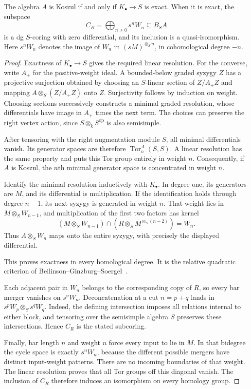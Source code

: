 \begin{theorem}\label{cbc:quiver:koszul}
The algebra $A$ is Koszul if and only if $K_\bullet\to S$ is exact.
When it is exact, the subspace
\[
 C_R=\bigoplus_{n\ge0}s^nW_n\subseteq B_SA
\]
is a dg $S$-coring with zero differential, and its inclusion is a quasi-isomorphism.
Here $s^nW_n$ denotes the image of $W_n$ in $(sM)^{\otimes_S n}$, in cohomological degree $-n$.
\end{theorem}
\begin{proof}
Exactness of $K_\bullet\to S$ gives the required linear resolution.
For the converse, write $A_+$ for the positive-weight ideal.
A bounded-below graded syzygy $Z$ has a projective surjection obtained by choosing an $S$-linear section of $Z/A_+Z$ and mapping
$A\otimes_S(Z/A_+Z)$ onto $Z$.
Surjectivity follows by induction on weight.
Choosing sections successively constructs a minimal graded resolution, whose differentials have image in $A_+$ times the next term.
The choices can preserve the right vertex action, since $S\otimes_k S^{\mathrm{op}}$ is also semisimple.

After tensoring with the right augmentation module $S$, all minimal differentials vanish.
Its generator spaces are therefore $\operatorname{Tor}^A_n(S,S)$.
A linear resolution has the same property and puts this Tor group entirely in weight $n$.
Consequently, if $A$ is Koszul, the $n$th minimal generator space is concentrated in weight $n$.

Identify the minimal resolution inductively with $K_\bullet$.
In degree one, its generators are $M$, and its differential is multiplication.
If the identification holds through degree $n-1$, its next syzygy is generated in weight $n$.
That weight lies in $M\otimes_S W_{n-1}$, and multiplication of the first two factors has kernel
\[
 (M\otimes_S W_{n-1})\cap
 (R\otimes_S M^{\otimes_S(n-2)})=W_n.
\]
Thus $A\otimes_S W_n$ maps onto the entire syzygy, with precisely the displayed differential.

This proves exactness in every homological degree.
It is the relative quadratic criterion of Beilinson--Ginzburg--Soergel~\cite[Theorem~2.6.1]{BGS1996}.

Each adjacent pair in $W_n$ belongs to the corresponding copy of $R$, so every bar merger vanishes on $s^nW_n$.
Deconcatenation at a cut $n=p+q$ lands in $s^pW_p\otimes_S s^qW_q$.
Indeed, the defining intersection imposes all relations internal to either block, and tensoring over the semisimple algebra $S$ preserves these intersections.
Hence $C_R$ is the stated subcoring.

Finally, bar length $n$ and weight $n$ force every input to lie in $M$.
In that bidegree the cycle space is exactly $s^nW_n$, because the different possible mergers have distinct input-weight patterns.
There are no incoming boundaries of that weight.
The linear resolution proves that all Tor groups off this diagonal vanish.
The inclusion of $C_R$ therefore induces an isomorphism on every homology group.
\end{proof}


